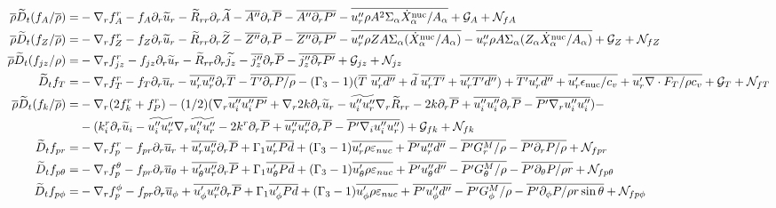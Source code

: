 \documentclass[10pt,paper=a4]{report}
\newcommand{\eht}{\overline}
\newcommand{\fht}{\widetilde}
\newcommand{\fav}{\widetilde}
\def\erho{\eht{\rho}}
\begin{document}
\begin{table}[!h]
\begin{align}
\erho \fav{D}_t (f_A / \eht{\rho}) = &  -\nabla_r f_A^r - f_A \partial_r \fht{u}_r - \fht{R}_{rr} \partial_r \fht{A} -\eht{A''} \partial_r \eht{P} - \eht{A'' \partial_r P'} - \overline{u''_r \rho A^2\Sigma_\alpha \dot{X}_\alpha^{\rm nuc} / A_\alpha} + {\mathcal G_A} + {\mathcal N_{fA}}                \label{eq:rans_fabar} \\
\erho \fav{D}_t (f_Z / \eht{\rho}) = &  -\nabla_r f_Z^r  - f_Z \partial_r \fht{u}_r - \fht{R}_{rr} \partial_r \fht{Z} -\eht{Z''} \partial_r \eht{P} - \eht{Z'' \partial_r P'} - \overline{u''_r \rho Z A \Sigma_\alpha (\dot{X}_\alpha^{\rm nuc}/ A_\alpha)} - \overline{u''_r \rho A \Sigma_\alpha (Z_\alpha \dot{X}_\alpha^{\rm nuc} / A_\alpha)}  + {\mathcal G_Z} + {\mathcal N_{fZ}}   \label{eq:rans_fzbar}  \\
\erho \fav{D}_t (f_{jz} / \rho) = & -\nabla_r f_{jz}^r  - f_{jz} \partial_r \fht{u}_r - \fht{R}_{rr} \partial_r \fht{j_z} -\eht{j''_z} \partial_r \eht{P} - \eht{j''_z \partial_r P'} + {\mathcal G_{jz}} + {\mathcal N_{jz}} \label{eq:rans_fjz} \\
\fht{D}_t f_T = & -\nabla_r f_T^r - f_T \partial_r \eht{u}_r - \eht{u'_r u''_r} \partial_r \eht{T} - \eht{T'\partial_r P / \rho} - (\Gamma_3 -1)(\eht{T} \ \eht{u'_r d''}+\fht{d} \ \eht{u'_r T'} + \eht{u'_r T'd''}) +\eht{T'u'_rd''} + \eht{u'_r \epsilon_{\rm nuc}/c_v} +  \eht{u'_r \nabla \cdot F_T / \rho c_v} + {\mathcal G_{T}} +  {\mathcal N_{fT}} \\
\erho \fav{D}_t (f_k / \eht{\rho}) = &  -\nabla_r ( 2 f_k^r + f_P^r ) - (1/2)(\nabla_r \eht{u''_iu''_iP'} + \nabla_r 2 k \partial_r \fht{u}_r - \fht{u''_iu''_r}\nabla_r \fht{R}_{rr} - 2 k \partial_r \eht{P} + \eht{u''_iu''_i}\partial_r \eht{P} - \eht{P'\nabla_r u''_iu''_i}) - \\
& - (k_i^r\partial_r \fht{u}_i - \fht{u''_iu''_r} \nabla_r \fht{u''_i u''_r} - 2 k^r \partial_r \eht{P} + \eht{u''_r u''_r} \partial_r \eht{P} - \eht{P'\nabla_iu''_iu''_r}) + {\mathcal G_{fk}} + {\mathcal N_{fk}} \\
\fht{D}_t f_{pr} = & -\nabla_r f_p^r - f_{pr} \partial_r \eht{u}_r + \eht{u'_r u''_r}\partial_r \eht{P} + \Gamma_1 \eht{u'_r P d} + (\Gamma_3 -1)\eht{u'_r \rho \varepsilon_{nuc}} + \eht{P'u''_r d''} - \eht{P' G_r^M / \rho} - \eht{P'\partial_r P/ \rho}  + {\mathcal N_{fpr}} \\
\fht{D}_t f_{p\theta} = & -\nabla_r f_p^\theta - f_{pr} \partial_r \eht{u}_\theta + \eht{u'_\theta u''_r}\partial_r \eht{P} + \Gamma_1 \eht{u'_\theta P d} + (\Gamma_3 -1)\eht{u'_\theta \rho \varepsilon_{nuc}} + \eht{P'u''_\theta d''} - \eht{P' G_\theta^M / \rho} - \eht{P'\partial_\theta P/ \rho r}  + {\mathcal N_{fp\theta}} \\
\fht{D}_t f_{p\phi} = & -\nabla_r f_p^\phi - f_{pr} \partial_r \eht{u}_\phi + \eht{u'_\phi u''_r}\partial_r \eht{P} + \Gamma_1 \eht{u'_\phi P d} + (\Gamma_3 -1)\eht{u'_\phi \rho \varepsilon_{nuc}} + \eht{P'u''_\phi d''} - \eht{P' G_\phi^M / \rho} - \eht{P'\partial_\phi P/ \rho r \sin{\theta}}  + {\mathcal N_{fp\phi}}
\end{align} 
\end{table}
\end{document}
